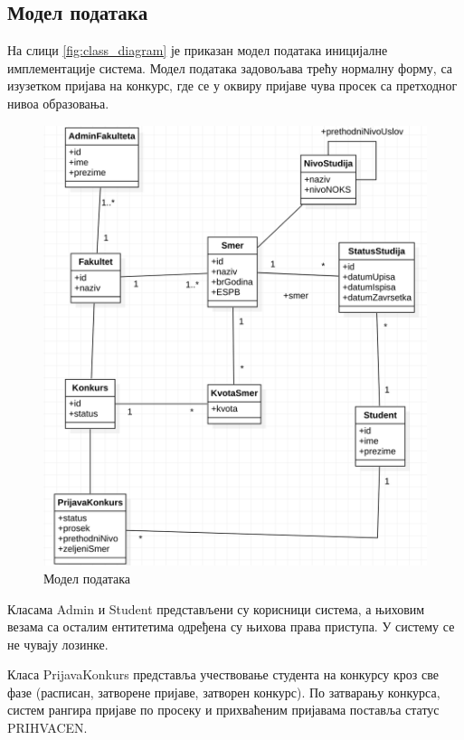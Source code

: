 \documentclass[a4paper]{article}
\begin{document}
\subsection*{Модел података}

На слици \autoref{fig:class_diagram} је приказан модел података иницијалне имплементације система. Модел података задовољава трећу нормалну форму, са
изузетком пријава на конкурс, где се у оквиру пријаве чува просек са претходног нивоа образовања.

\begin{figure}[H]
    \centering
    \includegraphics{images/class_diagram.png}
    \caption{Модел података}
    \label{fig:class_diagram}
\end{figure}

Класама Admin и Student представљени су корисници система, а њиховим везама са осталим ентитетима одређена су њихова права приступа. У систему се не чувају лозинке.

Класа PrijavaKonkurs представља учествовање студента на конкурсу кроз све фазе (расписан, затворене пријаве, затворен конкурс).
По затварању конкурса, систем рангира пријаве по просеку и прихваћеним пријавама поставља статус PRIHVACEN.
\end{document}
